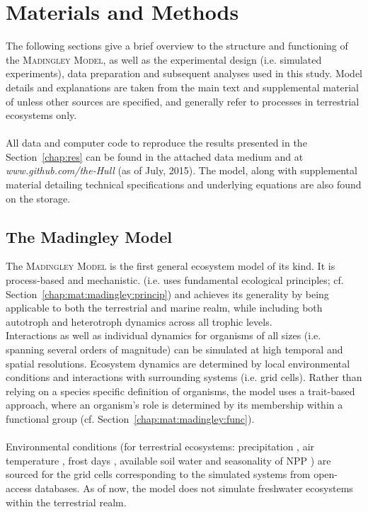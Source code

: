 \chapter{Materials and Methods}
\label{chap:mat}
The following sections give a brief overview to the    structure and functioning of the \textsc{Madingley Model}, as well as the experimental design (i.e. simulated experiments), data preparation and subsequent analyses used in this study. Model details and explanations are taken from the main text and supplemental material of \cite{Harfoot2014} unless other sources are specified, and generally refer to processes in terrestrial ecosystems only.\\\\
 All data and computer code to reproduce the results presented in the Section~\ref{chap:res} can be found in the attached data medium and at \textit{www.github.com/the-Hull} (as of July, 2015). The model, along with supplemental material detailing technical specifications and underlying equations are also found on the storage.
\section{The Madingley Model}
\label{chap:mat:madingley}
%
The \textsc{Madingley Model} is the first general ecosystem model of its kind. 
It is process-based  and mechanistic. (i.e. uses fundamental ecological principles; cf. Section~\ref{chap:mat:madingley:princip}) and achieves its generality by being applicable to both the terrestrial and marine realm, while including both autotroph and heterotroph dynamics across all trophic levels. \\
Interactions as well as individual  dynamics for organisms of all sizes (i.e. spanning several orders of magnitude) can be simulated at high temporal and spatial resolutions. 
Ecosystem dynamics are determined by local environmental conditions and interactions with surrounding systems (i.e. grid cells). 
Rather than relying on a species specific definition of organisms, the model uses a trait-based approach, where an organism's role is determined by its membership within a functional group (cf. Section~\ref{chap:mat:madingley:func}).
\\\\
Environmental conditions (for terrestrial ecosystems: precipitation
, air temperature , frost days , available soil water   and seasonality of NPP ) are sourced for the grid cells corresponding to the simulated systems  from open-access databases. As of now, the model does not simulate freshwater ecosystems within the terrestrial realm.
